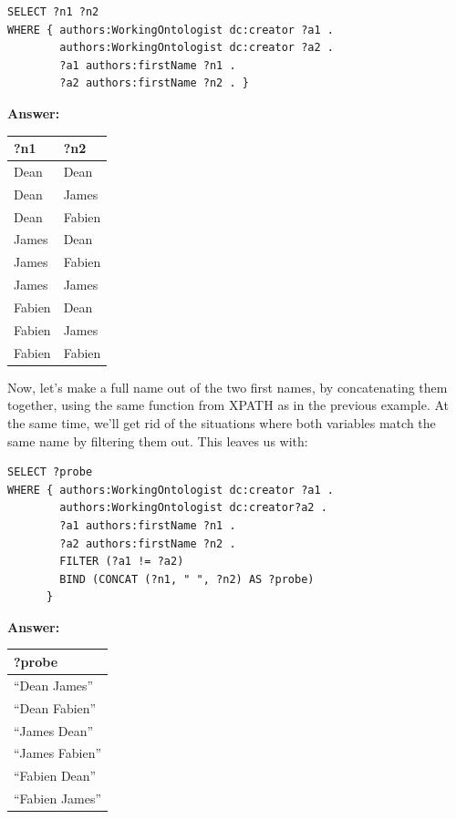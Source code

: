 
\begin{lstlisting}
SELECT ?n1 ?n2
WHERE { authors:WorkingOntologist dc:creator ?a1 .
        authors:WorkingOntologist dc:creator ?a2 .
        ?a1 authors:firstName ?n1 .
        ?a2 authors:firstName ?n2 . }
\end{lstlisting}

\textbf{\textbf{Answer:}}

\begin{tabular} {|ll|}
\hline
?n1&?n2\\
\hline
Dean&Dean\\
Dean&James\\
Dean&Fabien\\
James&Dean\\
James&Fabien\\
James&James\\
Fabien&Dean\\
Fabien&James\\
Fabien&Fabien\\
\hline
\end{tabular}

Now, let's make a full name out of the two first names, by concatenating
them together, using the same function from XPATH as in the previous
example. At the same time, we'll get rid of the situations where both
variables match the same name by filtering them out. This leaves us
with:


\begin{lstlisting}
SELECT ?probe
WHERE { authors:WorkingOntologist dc:creator ?a1 .
        authors:WorkingOntologist dc:creator?a2 .
        ?a1 authors:firstName ?n1 .
        ?a2 authors:firstName ?n2 .
        FILTER (?a1 != ?a2)
        BIND (CONCAT (?n1, " ", ?n2) AS ?probe)
      }

\end{lstlisting}


\textbf{\textbf{Answer:}}

\begin{tabular} {|l|}
\hline
?probe\\
\hline
``Dean James''\\
``Dean Fabien''\\
``James Dean''\\
``James Fabien''\\
``Fabien Dean''\\
``Fabien James''\\
\hline
\end{tabular}

